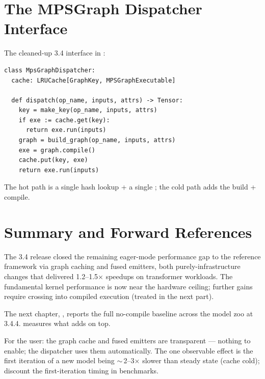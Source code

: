 \section{The MPSGraph Dispatcher Interface}
\label{sec:mpsgraph_dispatch:dispatcher_iface}

The cleaned-up 3.4 interface in
:

\begin{lstlisting}[style=lucid,language=LucidPython]
class MpsGraphDispatcher:
  cache: LRUCache[GraphKey, MPSGraphExecutable]

  def dispatch(op_name, inputs, attrs) -> Tensor:
    key = make_key(op_name, inputs, attrs)
    if exe := cache.get(key):
      return exe.run(inputs)
    graph = build_graph(op_name, inputs, attrs)
    exe = graph.compile()
    cache.put(key, exe)
    return exe.run(inputs)
\end{lstlisting}

The hot path is a single hash lookup + a single
; the cold path adds the build + compile.

\section{Summary and Forward References}
\label{sec:mpsgraph_dispatch:summary}

The 3.4 release closed the remaining eager-mode performance
gap to the reference framework via graph caching and fused
emitters, both purely-infrastructure changes that delivered
1.2--1.5$\times$ speedups on transformer workloads. The
fundamental kernel performance is now near the hardware ceiling;
further gains require crossing into compiled execution (treated
in the next part).

The next chapter, , reports the full
no-compile baseline across the model zoo at 3.4.4.
 measures what 
adds on top.

\begin{lucidnote}
For the user: the graph cache and fused emitters are
transparent --- nothing to enable; the dispatcher uses them
automatically. The one observable effect is the first iteration
of a new model being $\sim$\,2--3$\times$ slower than steady
state (cache cold); discount the first-iteration timing in
benchmarks.
\end{lucidnote}

